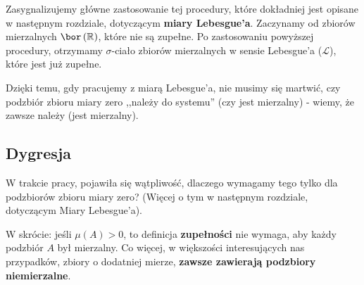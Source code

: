 Zasygnalizujemy główne zastosowanie tej procedury, które dokładniej jest opisane w następnym rozdziale, dotyczącym \textbf{miary Lebesgue'a}. Zaczynamy od zbiorów mierzalnych $\bor\left(\mathbb{R} \right) $, które nie są zupełne. Po zastosowaniu powyższej procedury, otrzymamy $\sigma $-ciało zbiorów mierzalnych w sensie Lebesgue'a ($\mathcal{L}$), które jest już zupełne.

Dzięki temu, gdy pracujemy z miarą Lebesgue'a, nie musimy się martwić, czy podzbiór zbioru miary zero ,,należy do systemu'' (czy jest mierzalny) - wiemy, że zawsze należy (jest mierzalny).

\subsection{Dygresja}


W trakcie pracy, pojawiła się wątpliwość, dlaczego wymagamy tego tylko dla podzbiorów zbioru miary zero?
(Więcej o tym w następnym rozdziale, dotyczącym Miary Lebesgue'a).

W skrócie: jeśli  $\mu\left( A \right) > 0$, to definicja \textbf{zupełności} nie wymaga, aby każdy podzbiór $A$ był mierzalny. Co więcej, w większości interesujących nas przypadków, zbiory o dodatniej mierze, \textbf{zawsze zawierają podzbiory niemierzalne}.

